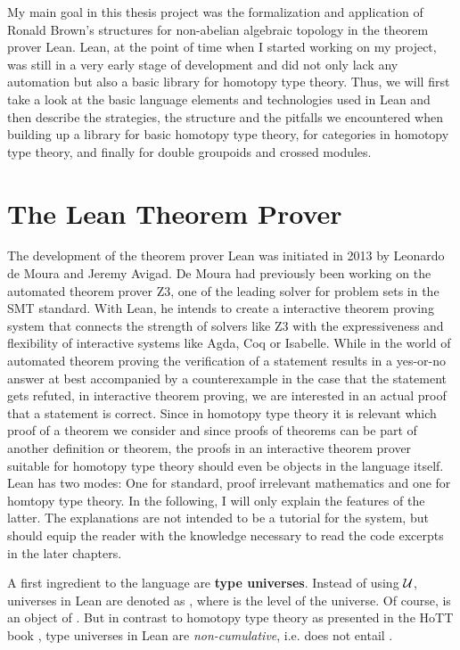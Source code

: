 My main goal in this thesis project was the formalization and application of
Ronald Brown's structures for non-abelian algebraic topology in the theorem prover
Lean.
Lean, at the point of time when I started working on my project, was still in a very early
stage of development and did not only lack any automation but also a basic library
for homotopy type theory.
Thus, we will first take a look at the basic language elements and technologies
used in Lean and then describe the strategies, the structure and the pitfalls
we encountered when building up a library for basic homotopy type theory,
for categories in homotopy type theory, and finally for double groupoids and
crossed modules.

\section{The Lean Theorem Prover}

The development of the theorem prover Lean was initiated in 2013 by Leo\-nar\-do
de Moura and Jeremy Avigad.
De Moura had previously been working on the automated theorem prover Z3, one of the leading
solver for problem sets in the SMT standard.
With Lean, he intends to create a interactive theorem proving system that connects
the strength of solvers like Z3 with the expressiveness and flexibility of
interactive systems like Agda, Coq or Isabelle.
While in the world of automated theorem proving the verification of a statement
results in a yes-or-no answer at best accompanied by a counterexample in the case
that the statement gets refuted, in interactive theorem proving, we are interested
in an actual proof that a statement is correct.
Since in homotopy type theory it is relevant which proof of a theorem we consider
and since proofs of theorems can be part of another definition or theorem,
the proofs in an interactive theorem prover suitable for homotopy type theory
should even be objects in the language itself.
Lean has two modes: One for standard, proof irrelevant mathematics and one for
homtopy type theory.
In the following, I will only explain the features of the latter.
The explanations are not intended to be a tutorial for the system, but should
equip the reader with the knowledge necessary to read the code excerpts in the
later chapters.

A first ingredient to the language are \textbf{type universes}.
Instead of using $\mathcal{U}$, universes in Lean are denoted as , where
 is the level of the universe.
Of course,  is an object of .
But in contrast to homotopy type theory as presented in the HoTT book \cite{hottbook},
type universes in Lean are \emph{non-cumulative}, 
i.e.  does not entail .

